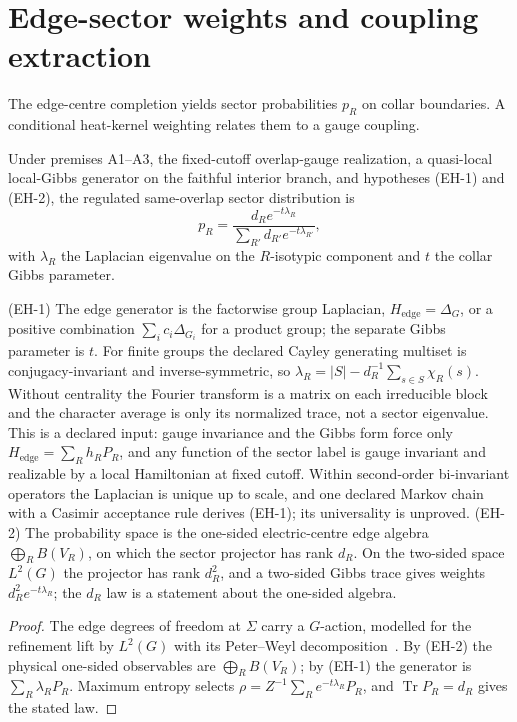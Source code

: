 \documentclass[11pt]{article}
\begin{document}
\section{Edge-sector weights and coupling extraction}
\label{sec:heat-kernel}

The edge-centre completion yields sector probabilities \(p_R\) on collar
boundaries. A conditional heat-kernel weighting relates them to a gauge
coupling.

\begin{theorem}
\label{thm:edge-sector-law}
Under premises A1--A3, the fixed-cutoff overlap-gauge realization, a
quasi-local local-Gibbs generator on the faithful interior branch, and
hypotheses (EH-1) and (EH-2), the regulated same-overlap sector distribution
is
\[
p_R=\frac{d_Re^{-t\lambda_R}}{\sum_{R'}d_{R'}e^{-t\lambda_{R'}}},
\]
with \(\lambda_R\) the Laplacian eigenvalue on the \(R\)-isotypic component
and \(t\) the collar Gibbs parameter.
\end{theorem}

(EH-1) The edge generator is the factorwise group Laplacian,
\(H_{\mathrm{edge}} = \Delta_G\), or a positive combination
\(\sum_ic_i\Delta_{G_i}\) for a product group; the separate Gibbs parameter is
\(t\). For finite groups the declared Cayley generating multiset is
conjugacy-invariant and inverse-symmetric, so
\(\lambda_R=|S|-d_R^{-1}\sum_{s\in S}\chi_R(s)\). Without centrality the
Fourier transform is a matrix on each irreducible block and the character
average is only its normalized trace, not a sector eigenvalue. This is a
declared input: gauge invariance and the Gibbs form force only
\(H_{\mathrm{edge}}=\sum_Rh_RP_R\), and any function of the sector label is
gauge invariant and realizable by a local Hamiltonian at fixed cutoff. Within
second-order bi-invariant operators the Laplacian is unique up to scale, and
one declared Markov chain with a Casimir acceptance rule derives (EH-1); its
universality is unproved. (EH-2) The probability space is the one-sided
electric-centre edge algebra \(\bigoplus_RB(V_R)\), on which the sector
projector has rank \(d_R\). On the two-sided space \(L^2(G)\) the projector has
rank \(d_R^2\), and a two-sided Gibbs trace gives weights
\(d_R^2e^{-t\lambda_R}\); the \(d_R\) law is a statement about the one-sided
algebra.

\begin{proof}
The edge degrees of freedom at \(\Sigma\) carry a \(G\)-action, modelled for the
refinement lift by \(L^2(G)\) with its Peter--Weyl
decomposition~\cite{peterWeyl27}. By (EH-2) the physical one-sided observables
are \(\bigoplus_RB(V_R)\); by (EH-1) the generator is
\(\sum_R\lambda_RP_R\). Maximum entropy selects
\(\rho=Z^{-1}\sum_Re^{-t\lambda_R}P_R\), and \(\operatorname{Tr}P_R=d_R\) gives
the stated law.
\end{proof}
\end{document}
